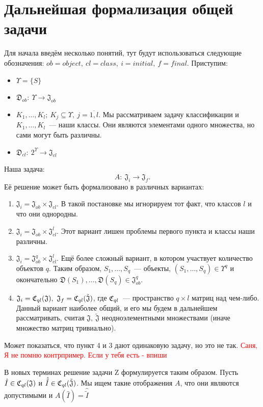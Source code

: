\documentclass[a4paper, 12pt]{report}
\begin{document}
\section{Дальнейшая формализация общей задачи}
Для начала введём несколько понятий, тут будут использоваться следующие обозначения: $ob = object,\ cl=class,\ i=initial,\ f=final$.
Приступим:
\begin{itemize}
  \item $\Upsilon=\{S\}$
  \item $\mathfrak{D}_{ob}:\ \Upsilon\rightarrow\mathfrak{J}_{ob}$
  \item $K_1,\ldots,K_l;\ K_j \subseteq \Upsilon,\ j=\overline{1,l}$. Мы рассматриваем задачу классификации и $K_1,\ldots,K_l$~--- наши классы. Они являются элементами одного множества, но сами могут быть различны.
  \item $\mathfrak{D}_{cl}:\ 2^{\Upsilon}\rightarrow\mathfrak{J}_{cl}$
\end{itemize}
Наша задача:
\[
A:\ \mathfrak{J}_i \rightarrow \mathfrak{J}_f.
\]
Её решение может быть формализовано в различных вариантах:
\begin{enumerate}
  \item $\mathfrak{J}_i = \mathfrak{J}_{ob}\times\mathfrak{J}_{cl}$. В такой постановке мы игнорируем тот факт, что классов $l$ и что они однородны.
  \item $\mathfrak{J}_i = \mathfrak{J}_{ob}\times\mathfrak{J}_{cl}^l$. Этот вариант лишен проблемы первого пункта и классы наши различны.
  \item $\mathfrak{J}_i = \mathfrak{J}_{ob}^q\times\mathfrak{J}_{cl}^l$. Ещё более сложный вариант, в котором участвует количество объектов $q$. Таким образом, $S_1,\ldots,S_q$~--- объекты, $(S_1,\ldots,S_q)\in\Upsilon^q$ и окончательно $\mathfrak{D}(S_1),\ldots,\mathfrak{D}(S_q) \in \mathfrak{J}_{ob}^q$.
  \item $\mathfrak{J}_i = \Cql(\mathfrak{J}),\ \mathfrak{J}_f = \Cql(\tilde{\mathfrak{J}})$, где $\mathfrak{C}_{ql}$~--- пространство $q\times l$ матриц над чем-либо. Данный вариант наиболее общий, и его мы будем в дальнейшем рассматривать, считая $\mathfrak{J},\ \tilde{\mathfrak{J}}$ неодноэлементными множествами (иначе множество матриц тривиально).
\end{enumerate}

Может показаться, что пункт 4 и 3 дают одинаковую задачу, но это не так. \textcolor{red}{Саня, Я не помню контрпример. Если у тебя есть - впиши}

В новых терминах решение задачи Z формулируется таким образом. Пусть $\hat{I} \in \mathfrak{C}_{ql}(\mathfrak{J})$ и $\hat{\tilde{I}} \in \mathfrak{C}_{ql}(\tilde{\mathfrak{J}})$. Мы ищем такие отображения $A$, что они являются допустимыми и $A(\hat{I}) = \hat{\tilde{I}}$
\end{document}
